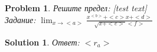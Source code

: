 \documentclass{article}%
\newtheorem*{problem*}{Problem}%
\newtheorem*{solution*}{Solution}%
\begin{document}
\begin{problem*}
Решите предел: [test text] \\
Задание: $ \lim_{x \to {<a>}} \frac{x^{<b>}+<c>x+<d>}{\sqrt{x + <e>} <f>} $%
\end{problem*}

\begin{solution*}
Ответ: $<r_a>$
\end{solution*}
\end{document}
